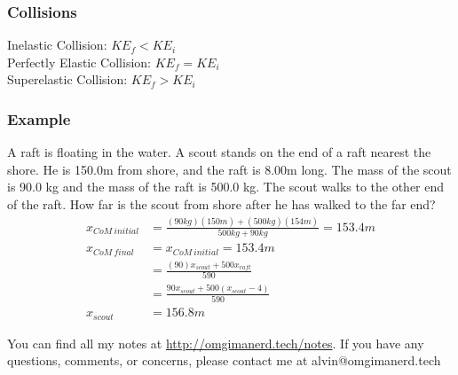 \documentclass[letterpaper, 12pt]{math}
\begin{document}
\subsubsection*{Collisions}
Inelastic Collision: \( KE_f < KE_i \) \\
Perfectly Elastic Collision: \( KE_f = KE_i \) \\
Superelastic Collision: \( KE_f > KE_i \)

\subsubsection*{Example}
A raft is floating in the water. A scout stands on the end of a raft nearest
the shore. He is 150.0m from shore, and the raft is 8.00m long. The mass of the
scout is 90.0 kg and the mass of the raft is 500.0 kg. The scout walks to the
other end of the raft. How far is the scout from shore after he has walked to
the far end?
\begin{align*}
  x_{CoM~initial} &= \frac{(90kg)(150m)+(500kg)(154m)}{500kg+90kg} = 153.4m \\
  x_{CoM~final} &= x_{CoM~initial} = 153.4m \\
  &= \frac{(90)x_{scout}+500x_{raft}}{590} \\
  &= \frac{90x_{scout}+500(x_{scout}-4)}{590} \\
  x_{scout} &= 156.8m
\end{align*}

\begin{center}
  You can find all my notes at \url{http://omgimanerd.tech/notes}. If you have
  any questions, comments, or concerns, please contact me at
  alvin@omgimanerd.tech
\end{center}
\end{document}
